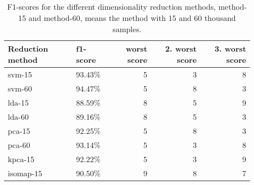 \begin{table}
    \centering
    \begin{tabular}{llrrr}
        \hline
        Reduction method & f1-score & worst score & 2. worst score & 3. worst score \\
        \hline
        \gls{svm}-15 & 93.43\% & 5 & 3 & 8 \\
        \gls{svm}-60 & 94.47\% & 5 & 8 & 3 \\
        \gls{lda}-15 & 88.59\% & 8 & 5 & 9 \\
        \gls{lda}-60 & 89.16\% & 8 & 5 & 3 \\
        \gls{pca}-15 & 92.25\% & 5 & 8 & 3 \\
        \gls{pca}-60 & 93.14\% & 5 & 3 & 8 \\
        \gls{kpca}-15 & 92.22\% & 5 & 3 & 9 \\
        \gls{isomap}-15 & 90.50\% & 9 & 8 & 7 \\
        \hline
    \end{tabular}
    \caption{F1-scores for the different dimensionality reduction methods, method-15 and method-60, means the method with 15 and 60 thousand samples.}
    \label{tab:discussion-experiment-1-f1-score}
    \end{table}